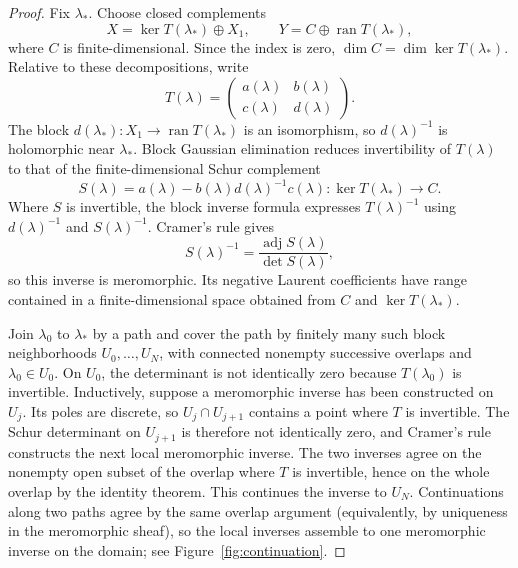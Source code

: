\documentclass[12pt,oneside,reqno]{article}
\theoremstyle{plain}
\theoremstyle{definition}
\theoremstyle{remark}
\begin{document}
\begin{proof}
Fix \(\lambda_*\). Choose closed complements
\[
 X=\ker T(\lambda_*)\oplus X_1,
 \qquad
 Y=C\oplus\operatorname{ran}T(\lambda_*),
\]
where \(C\) is finite-dimensional. Since the index is zero,
\(\dim C=\dim\ker T(\lambda_*)\). Relative to these decompositions, write
\[
 T(\lambda)=
 \begin{pmatrix}a(\lambda)&b(\lambda)\\
                 c(\lambda)&d(\lambda)
 \end{pmatrix}.
\]
The block \(d(\lambda_*):X_1\to\operatorname{ran}T(\lambda_*)\) is an
isomorphism, so \(d(\lambda)^{-1}\) is holomorphic near \(\lambda_*\). Block
Gaussian elimination reduces invertibility of \(T(\lambda)\) to that of
the finite-dimensional Schur complement
\[
 S(\lambda)=a(\lambda)-b(\lambda)d(\lambda)^{-1}c(\lambda):
 \ker T(\lambda_*)\longrightarrow C.
\]
Where \(S\) is invertible, the block inverse formula expresses
\(T(\lambda)^{-1}\) using \(d(\lambda)^{-1}\) and \(S(\lambda)^{-1}\).
Cramer's rule gives
\[
 S(\lambda)^{-1}
 =\frac{\operatorname{adj}S(\lambda)}{\det S(\lambda)},
\]
so this inverse is meromorphic. Its negative Laurent coefficients have
range contained in a finite-dimensional space obtained from \(C\) and
\(\ker T(\lambda_*)\).

Join \(\lambda_0\) to \(\lambda_*\) by a path and cover the path by finitely
many such block neighborhoods \(U_0,\ldots,U_N\), with connected nonempty
successive overlaps and \(\lambda_0\in U_0\).  On \(U_0\), the determinant
is not identically zero because \(T(\lambda_0)\) is invertible.  Inductively,
suppose a meromorphic inverse has been constructed on \(U_j\).  Its poles
are discrete, so \(U_j\cap U_{j+1}\) contains a point where \(T\) is
invertible.  The Schur determinant on \(U_{j+1}\) is therefore not
identically zero, and Cramer's rule constructs the next local meromorphic
inverse.  The two inverses agree on the nonempty open subset of the overlap
where \(T\) is invertible, hence on the whole overlap by the identity
theorem.  This continues the inverse to \(U_N\).  Continuations along two
paths agree by the same overlap argument (equivalently, by uniqueness in the
meromorphic sheaf), so the local inverses assemble to one meromorphic inverse
on the domain; see Figure~\ref{fig:continuation}.
\end{proof}
\end{document}

